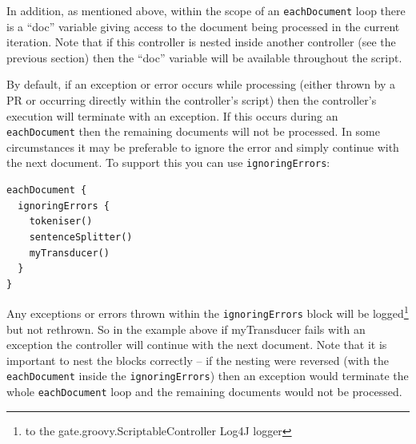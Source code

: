 In addition, as mentioned above, within the scope of an {\tt eachDocument} loop
there is a ``doc'' variable giving access to the document being processed in
the current iteration.  Note that if this controller is nested inside another
controller (see the previous section) then the ``doc'' variable will be
available throughout the script.


By default, if an exception or error occurs while processing (either thrown by
a PR or occurring directly within the controller's script) then the
controller's execution will terminate with an exception.  If this occurs during
an {\tt eachDocument} then the remaining documents will not be processed.  In
some circumstances it may be preferable to ignore the error and simply continue
with the next document.  To support this you can use {\tt ignoringErrors}:
\begin{lstlisting}
eachDocument {
  ignoringErrors {
    tokeniser()
    sentenceSplitter()
    myTransducer()
  }
}
\end{lstlisting}
%
Any exceptions or errors thrown within the {\tt ignoringErrors} block will be
logged\footnote{to the gate.groovy.ScriptableController Log4J logger} but not
rethrown.  So in the example above if myTransducer fails with an exception the
controller will continue with the next document.  Note that it is important to
nest the blocks correctly -- if the nesting were reversed (with the
{\tt eachDocument} inside the {\tt ignoringErrors}) then an exception would
terminate the whole {\tt eachDocument} loop and the remaining documents would
not be processed.


